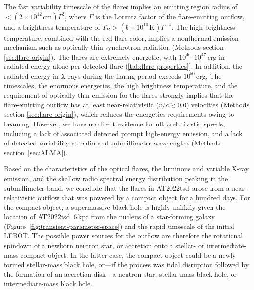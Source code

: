 \documentclass{nature_plusfigure}
\newcommand{\at}{AT2022tsd}
\begin{document}
The fast variability timescale of the flares implies an emitting region radius of $<(2\times10^{12}\,\mathrm{cm}) \Gamma^2$, where $\Gamma$ is the Lorentz factor of the flare-emitting outflow,
and a brightness temperature of $T_B>(6\times10^{10}\,\mathrm{K})\Gamma^{-4}$.
The high brightness temperature, combined with the red flare color, implies a nonthermal emission mechanism such as optically thin synchrotron radiation (Methods section \ref{sec:flare-origin}).
The flares are extremely energetic, with $10^{46}$--$10^{47}$\,erg in radiated energy alone per detected flare (\ref{tab:flare-properties}).
In addition, the radiated energy in X-rays during the flaring period exceeds $10^{50}$\,erg.
The timescales, the enormous energetics, the high brightness temperature, and the requirement of optically thin emission for the flares strongly implies that the flare-emitting outflow has at least near-relativistic ($v/c\gtrsim0.6$) velocities (Methods section \ref{sec:flare-origin}),
which reduces the energetics requirements owing to beaming.
However, we have no direct evidence for ultrarelativistic speeds, including a lack of associated detected prompt high-energy emission,
and a lack of detected variability at radio and submillimeter wavelengths (Methods section~\ref{sec:ALMA}).

Based on the characteristics of the optical flares, the luminous and variable X-ray emission, and the shallow radio spectral energy distribution peaking in the submillimeter band, we conclude that the flares in \at\ arose from a near-relativistic outflow that was powered by a compact object for a hundred days. For the compact object, a supermassive black hole is highly unlikely given the location of \at\ 6\,kpc from the nucleus of a star-forming galaxy (Figure~\ref{fig:transient-parameter-space}) and the rapid timescale of the initial LFBOT. The possible power sources for the outflow are therefore the rotational spindown of a newborn neutron star, or accretion onto a stellar- or intermediate-mass compact object. In the latter case, the compact object could be a newly formed stellar-mass black hole, or---if the process was tidal disruption followed by the formation of an accretion disk---a neutron star, stellar-mass black hole, or intermediate-mass black hole. 

\end{document}
